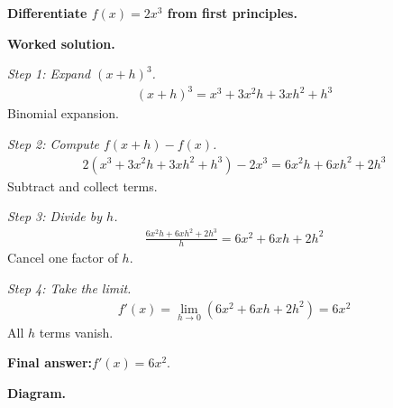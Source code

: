 \documentclass[11pt]{article}
\newcommand{\question}[1]{\par\medskip\noindent\textbf{#1}\par}
\begin{document}
\question{Differentiate \( f(x) = 2x^3 \) from first principles.}

\textbf{Worked solution.}

\textit{Step 1: Expand \( (x+h)^3 \).}
\[\begin{gathered}
(x+h)^3 = x^3 + 3x^2h + 3xh^2 + h^3
\end{gathered}\]
Binomial expansion.

\textit{Step 2: Compute \( f(x+h) - f(x) \).}
\[\begin{gathered}
2(x^3 + 3x^2h + 3xh^2 + h^3) - 2x^3 = 6x^2h + 6xh^2 + 2h^3
\end{gathered}\]
Subtract and collect terms.

\textit{Step 3: Divide by \( h \).}
\[\begin{gathered}
\frac{6x^2h + 6xh^2 + 2h^3}{h} = 6x^2 + 6xh + 2h^2
\end{gathered}\]
Cancel one factor of \( h \).

\textit{Step 4: Take the limit.}
\[\begin{gathered}
f'(x) = \lim_{h \to 0}(6x^2 + 6xh + 2h^2) = 6x^2
\end{gathered}\]
All \( h \) terms vanish.

\begin{answerbox}
\textbf{Final answer:}\quad \(\displaystyle  f'(x) = 6x^2 \).
\end{answerbox}
\textbf{Diagram.}
\end{document}
